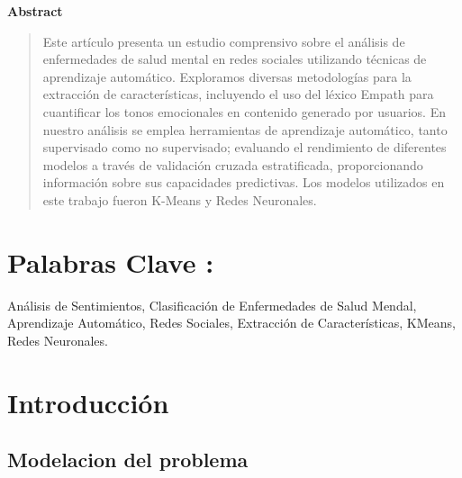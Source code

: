 \documentclass[
10pt, %
a4paper, %
oneside, %
headinclude,footinclude, %
BCOR5mm, %
]{scrartcl}
\begin{document}



\newpage %

\begin{center}
\textbf{Abstract}
\end{center}    
\begin{abstract}
Este artículo presenta un estudio comprensivo sobre el análisis de enfermedades de salud mental en redes sociales utilizando técnicas de aprendizaje automático.
Exploramos diversas metodologías para la extracción de características, incluyendo el uso del léxico Empath para cuantificar los tonos emocionales
en contenido generado por usuarios. En nuestro análisis se emplea herramientas de aprendizaje automático, tanto supervisado como no supervisado; 
evaluando el rendimiento de diferentes modelos a través de validación cruzada estratificada, proporcionando información sobre sus capacidades predictivas. Los modelos utilizados en 
este trabajo fueron K-Means y Redes Neuronales. 
\end{abstract}


\section*{Palabras Clave :} Análisis de Sentimientos, Clasificación de Enfermedades de Salud Mendal, Aprendizaje Automático, Redes
Sociales, Extracción de Características, KMeans, Redes Neuronales.

\tableofcontents

\section{Introducción}

\subsection{Modelacion del problema}
\end{document}
